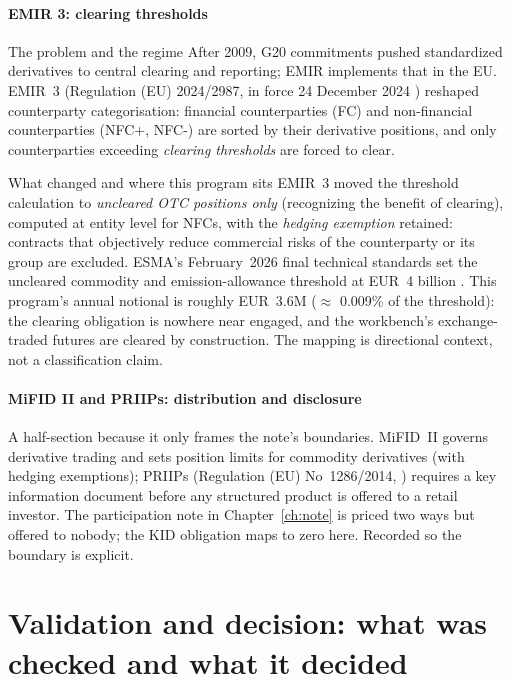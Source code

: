 \documentclass[11pt,a4paper]{article}
\begin{document}
\subsection{EMIR 3: clearing thresholds}

\begin{concept}{The problem and the regime}
After 2009, G20 commitments pushed standardized derivatives to central
clearing and reporting; EMIR implements that in the EU. EMIR~3
(Regulation (EU) 2024/2987, in force 24 December 2024
\cite{emir3}) reshaped counterparty categorisation: financial
counterparties (FC) and non-financial counterparties (NFC+, NFC-)
are sorted by their derivative positions, and only counterparties
exceeding \emph{clearing thresholds} are forced to clear.
\end{concept}

\begin{concept}{What changed and where this program sits}
EMIR~3 moved the threshold calculation to \emph{uncleared OTC
positions only} (recognizing the benefit of clearing), computed at
entity level for NFCs, with the \emph{hedging exemption} retained:
contracts that objectively reduce commercial risks of the counterparty
or its group are excluded. ESMA's February~2026 final technical
standards set the uncleared commodity and emission-allowance threshold
at EUR~4 billion \cite{emir3rts}. This program's annual notional is
roughly EUR~3.6M ($\approx$ 0.009\% of the threshold): the clearing
obligation is nowhere near engaged, and the workbench's exchange-traded
futures are cleared by construction. The mapping is directional
context, not a classification claim.
\end{concept}

\subsection{MiFID II and PRIIPs: distribution and disclosure}

A half-section because it only frames the note's boundaries. MiFID~II
governs derivative trading and sets position limits for commodity
derivatives (with hedging exemptions); PRIIPs (Regulation (EU)
No~1286/2014, \cite{priips}) requires a key information document before
any structured product is offered to a retail investor. The
participation note in Chapter~\ref{ch:note} is priced two ways but
offered to nobody; the KID obligation maps to zero here. Recorded so
the boundary is explicit.

\clearpage
\part{Validation and decision: what was checked and what it decided}
\end{document}
